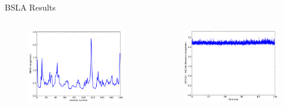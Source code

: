 \documentclass{beamer}
\begin{document}
\begin{frame}[t]
\begin{columns}[T,onlytextwidth]
\begin{column}{.48\linewidth}
{\begin{block}{BSLA Results}
            \begin{columns}[t]
                \begin{figure}
                    \includegraphics[width=1.0\textwidth]{figures/BSLA_solo/BSLA_solo_rmsf.pdf}  
                \end{figure}       

                \begin{figure}
                    \includegraphics[width=1.0\textwidth]{figures/BSLA_solo/BSLA_solo_dist_ASP133_HIS156.pdf} 
                \end{figure}        


\end{columns}
\end{block}}
\end{column}
\end{columns}
\end{frame}
\end{document}
